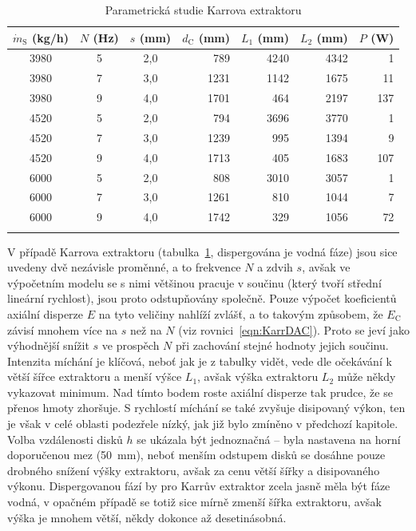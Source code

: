 \begin{table}[ht]
\caption{Parametrická studie Karrova extraktoru} \label{tab:calltableKarr}
\begin{center}
\begin{tabular}{ccc|rrrr}
	\Xhline{2pt}
	$\dot{m}_\mathrm{S}$ (kg/h) & $N$ (Hz) & $s$ (mm) & $d_\mathrm{C}$ (mm) & $L_1$ (mm) & $L_2$ (mm) & $P$ (W) \\ \hline
	3980 & 5 & 2,0 &  789 & 4240 & 4342 & 1 \\
	3980 & 7 & 3,0 & 1231 & 1142 & 1675 & 11 \\
	3980 & 9 & 4,0 & 1701 &  464 & 2197 & 137 \\
	4520 & 5 & 2,0 &  794 & 3696 & 3770 & 1 \\
	4520 & 7 & 3,0 & 1239 &  995 & 1394 & 9 \\
	4520 & 9 & 4,0 & 1713 &  405 & 1683 & 107 \\
	6000 & 5 & 2,0 &  808 & 3010 & 3057 & 1 \\
	6000 & 7 & 3,0 & 1261 &  810 & 1044 & 7 \\
	6000 & 9 & 4,0 & 1742 &  329 & 1056 & 72 \\
	\Xhline{2pt}
\end{tabular}
\end{center}
\end{table}
V případě Karrova extraktoru (tabulka~\ref{tab:calltableKarr}, dispergována je vodná fáze) jsou sice uvedeny dvě nezávisle proměnné, a to frekvence $N$ a zdvih $s$, avšak ve výpočetním modelu se s nimi většinou pracuje v součinu (který tvoří střední lineární rychlost), jsou proto odstupňovány společně.
Pouze výpočet koeficientů axiální disperze $E$ na tyto veličiny nahlíží zvlášť, a to takovým způsobem, že $E_\mathrm{C}$ závisí mnohem více na $s$ než na $N$ (viz rovnici~\ref{eqn:KarrDAC}).
Proto se jeví jako výhodnější snížit $s$ ve prospěch $N$ při zachování stejné hodnoty jejich součinu.
Intenzita míchání je klíčová, neboť jak je z tabulky vidět, vede dle očekávání k větší šířce extraktoru a menší výšce $L_1$, avšak výška extraktoru $L_2$ může někdy vykazovat minimum.
Nad tímto bodem roste axiální disperze tak prudce, že se přenos hmoty zhoršuje.
S rychlostí míchání se také zvyšuje disipovaný výkon, ten je však v celé oblasti podezřele nízký, jak již bylo zmíněno v předchozí kapitole.
Volba vzdálenosti disků $h$ se ukázala být jednoznačná -- byla nastavena na horní doporučenou mez (50~mm), neboť menším odstupem disků se dosáhne pouze drobného snížení výšky extraktoru, avšak za cenu větší šířky a disipovaného výkonu.
Dispergovanou fází by pro Karrův extraktor zcela jasně měla být fáze vodná, v opačném případě se totiž sice mírně zmenší šířka extraktoru, avšak výška je mnohem větší, někdy dokonce až desetinásobná.

